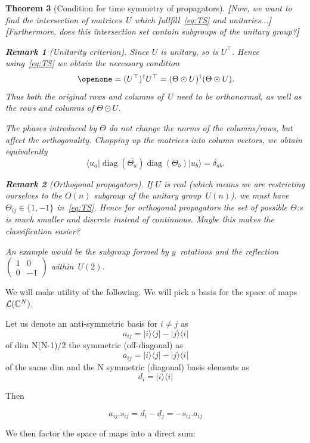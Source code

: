 \documentclass[aps,pra,12pt,nofootinbib,superscriptaddress,longbibliography,showpacs]{revtex4-1}
\newcommand{\yo}[1]{\textcolor{dblue}{\textbf{[}#1\textbf{]}}}
\theoremstyle{plain}
\newtheorem{theorem}{Theorem}   %
\theoremstyle{definition}
\newtheorem{remark}[theorem]{Remark}
\newcommand{\bra}[1]{\mbox{$\langle #1|$}}
\newcommand{\ket}[1]{\ensuremath{|#1\rangle}}
\DeclareMathOperator{\diag}{diag}
\newcommand{\hprod}{\odot}
\newcommand{\I}{\openone}     %
\newcommand{\be}{\begin{equation}}
\newcommand{\ee}{\end{equation}}
\def\2#1{{\cal #1}}
\def\7#1{{\mathbb #1}}
\begin{document}
\begin{theorem}[Condition for time symmetry of propagators]
\yo{Now, we want to find the intersection of matrices~$U$ which
  fullfill~\eqref{eq:TS} and unitaries...}
\yo{Furthermore, does this intersection set contain subgroups of the
  unitary group?}


\begin{remark}[Unitarity criterion]
Since $U$ is unitary, so is $U^\top$. Hence using~\eqref{eq:TS} we
obtain the necessary condition
\be
\I = (U^\top)^\dagger U^\top
= (\Theta \hprod U)^\dagger (\Theta \hprod U).
\ee
Thus both the original rows and columns of~$U$ need to be orthonormal,
as well as the rows and columns of $\Theta \hprod U$.

The phases introduced by $\Theta$ do not change the norms of the
columns/rows, but affect the orthogonality.
Chopping up the matrices into column vectors, we obtain equivalently
\be
\bra{u_a} \diag(\overline{\Theta_a}) \diag(\Theta_b) \ket{u_b} = \delta_{ab}.
\ee
\end{remark}

\begin{remark}[Orthogonal propagators]
If $U$ is real (which means we are restricting ourselves to the
$O(n)$ subgroup of the unitary group~$U(n)$), we must have $\Theta_{ij} \in
\{1, -1\}$ in~\eqref{eq:TS}.
Hence for orthogonal propagators the set of possible $\Theta$:s is
much smaller and discrete instead of continuous. Maybe this makes the
classification easier?

An example would be the subgroup formed by $y$~rotations and
the reflection
$\left( \begin{smallmatrix} 
  1 & 0\\
  0 & -1 
\end{smallmatrix} \right)$ within~$U(2)$.
\end{remark}
\end{theorem}

We will make utility of the following.  We will pick a basis for 
the space of maps $\2 L (\7 C^N)$.  

Let us denote an anti-symmetric basis for $i\neq j$ 
as 
$$ a_{ij} = \ket{i}\bra{j} - \ket{j}\bra{i} $$ 
of dim N(N-1)/2 
the symmetric (off-diagonal) as 
$$ a_{ij} = \ket{i}\bra{j} - \ket{j}\bra{i} $$ 
of the same dim 
and the N symmetric (diagonal) basis elements as 
$$ d_i = \ket{i}\bra{i} $$ 

Then 

$$ a_{ij}. s_{ij} = d_i - d_j = - s_{ij}. a_{ij} $$ 

We then factor the space of maps into a direct sum:
\end{document}
